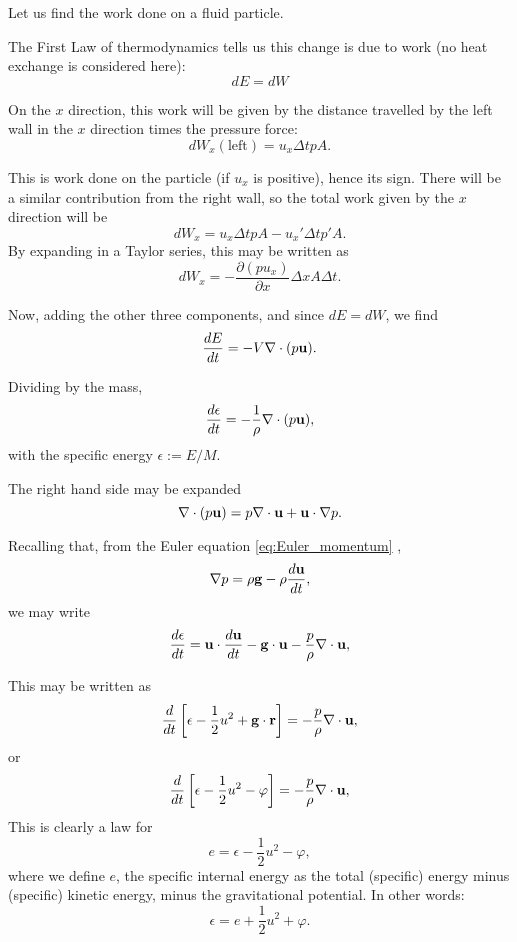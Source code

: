 Let us find the work done on a fluid particle.

The First Law of thermodynamics tells us this change is due
to work (no heat exchange is considered here):
\[
dE=dW
\]

On the $x$ direction, this work will be given by the distance
travelled by the left wall in the $x$ direction times the pressure
force:
\[
dW_x (\mathrm{left})  = u_x \Delta t p A .
\]

This is work done on the particle (if $u_x$ is positive), hence its
sign. There will be a similar contribution from the right wall, so the
total work given by the $x$ direction will be
\[
dW_x = u_x \Delta t p A  -  u_x'  \Delta t p' A .
\]
By expanding in a Taylor series, this may be written as
\[
dW_x = - \frac{\partial (p u_x)}{\partial x} \Delta x A \Delta t.
\]

Now, adding the other three components, and since $dE=dW$, we find
\[
\frac{dE}{dt} = - V \nabla\cdot (p\mathbf{u}) .
\]

Dividing by the mass,
\[
\frac{d \epsilon}{dt} = - \frac{1}{\rho} \nabla\cdot (p\mathbf{u}) ,
\]
with the specific energy $\epsilon:=E/M$.



The right hand side may be expanded
\[
\nabla\cdot (p\mathbf{u}) =
 p \nabla\cdot \mathbf{u} + 
 \mathbf{u} \cdot \nabla p .
\]

Recalling that, from the Euler equation \ref{eq:Euler_momentum} ,
\[
\nabla p  = \rho \mathbf{g} - \rho \frac{d \mathbf{u}}{dt} ,
\]
we may write
%
\begin{equation}
  \label{eq:specific_energy}
  \frac{d \epsilon}{dt} =
  \mathbf{u} \cdot \frac{d \mathbf{u}}{dt}  -
  \mathbf{g} \cdot  \mathbf{u} 
  -  \frac{p}{\rho} \nabla\cdot \mathbf{u} ,
\end{equation}

This may be written as
\[
\frac{d}{dt} \left[
  \epsilon - \frac12 u^2  + \mathbf{g} \cdot \mathbf{r}
  \right] = -  \frac{p}{\rho} \nabla\cdot \mathbf{u} ,
\]
or
\[
\frac{d}{dt} \left[
  \epsilon - \frac12 u^2  - \varphi
  \right] = -  \frac{p}{\rho} \nabla\cdot \mathbf{u} ,
\]
%
This is clearly a law for
\[
e = \epsilon - \frac12 u^2  - \varphi ,
\]
where we define $e$, the specific internal energy as the total (specific) energy
minus (specific) kinetic energy, minus the gravitational potential. In other words:
\[
\epsilon  = e  + \frac12 u^2  + \varphi .
\]

